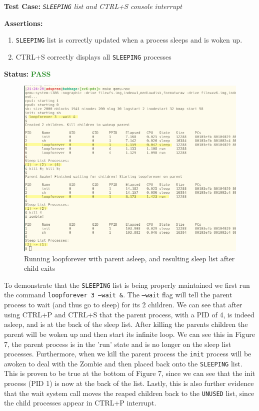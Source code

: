 \documentclass[11pt,letterpaper]{report}
\newcommand{\code}[1]{\colorbox{codegray}{\texttt{#1}}}
\begin{document}
{  \noindent\textbf{Test Case:} \emph{\code{SLEEPING} list and CTRL+S console interrupt}
  
  \noindent\textbf{Assertions:}
  \begin{enumerate}[]
  \item \code{SLEEPING} list is correctly updated when a process sleeps and is woken up.
  \item CTRL+S correctly displays all \code{SLEEPING} processes
  \end{enumerate}  
  
  \noindent\textbf{Status:} \textcolor{ForestGreen}{\textbf{PASS}}
  
  \begin{figure}[h!]
	\centering
	\includegraphics[width=1\linewidth]{sleeptest.png}
	\caption[img]{Running loopforever with parent asleep, and resulting sleep list after child exits}
	\label{fig:P1compileP0-1}
  \end{figure}

  To demonstrate that the \code{SLEEPING} list is being properly maintained we first run
  the command \code{loopforever 3 --wait \&}. The \code{--wait} flag will tell the 
  parent process to wait (and thus go to sleep) for its 2 children. We can see that 
  after using CTRL+P and CTRL+S that the parent process, with a PID of 4, is indeed asleep, and is at 
  the back of the sleep list. After killing the parents children the parent will be woken 
  up and then start its infinite loop. We can see this in Figure 7, the parent process is 
  in the 'run' state and is no longer on the sleep list processes. Furthermore, when we kill
  the parent process the \code{init} process will be awoken to deal with the Zombie and then
  placed back onto the \code{SLEEPING} list. This is proven to be true at the bottom of 
  Figure 7, since we can see that the init process (PID 1) is now at the back of the list. 
  Lastly, this is also further evidence that the wait system call moves the reaped children
  back to the \code{UNUSED} list, since the child processes appear in CTRL+P interrupt.

}
\end{document}
